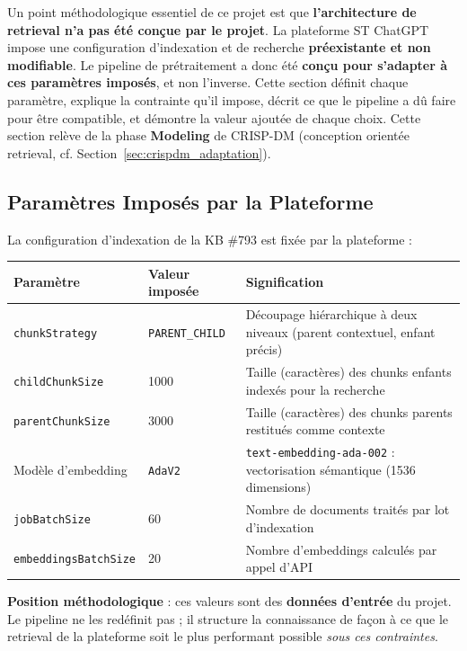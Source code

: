 \documentclass[12pt,a4paper]{report}
\begin{document}
Un point méthodologique essentiel de ce projet est que \textbf{l'architecture de retrieval n'a pas été conçue par le projet}. La plateforme ST ChatGPT impose une configuration d'indexation et de recherche \textbf{préexistante et non modifiable}. Le pipeline de prétraitement a donc été \textbf{conçu pour s'adapter à ces paramètres imposés}, et non l'inverse. Cette section définit chaque paramètre, explique la contrainte qu'il impose, décrit ce que le pipeline a dû faire pour être compatible, et démontre la valeur ajoutée de chaque choix. Cette section relève de la phase \textbf{Modeling} de CRISP-DM (conception orientée retrieval, cf. Section~\ref{sec:crispdm_adaptation}).

\subsection{Paramètres Imposés par la Plateforme}
\label{sec:params_plateforme}

La configuration d'indexation de la KB \#793 est fixée par la plateforme :

\begin{longtable}{p{4cm}p{2.5cm}p{6cm}}
\toprule
\textbf{Paramètre} & \textbf{Valeur imposée} & \textbf{Signification} \\
\midrule
\texttt{chunkStrategy} & \texttt{PARENT\_CHILD} & Découpage hiérarchique à deux niveaux (parent contextuel, enfant précis) \\
\texttt{childChunkSize} & 1000 & Taille (caractères) des chunks enfants indexés pour la recherche \\
\texttt{parentChunkSize} & 3000 & Taille (caractères) des chunks parents restitués comme contexte \\
Modèle d'embedding & \texttt{AdaV2} & \texttt{text-embedding-ada-002} : vectorisation sémantique (1536 dimensions) \\
\texttt{jobBatchSize} & 60 & Nombre de documents traités par lot d'indexation \\
\texttt{embeddingsBatchSize} & 20 & Nombre d'embeddings calculés par appel d'API \\
\bottomrule
\end{longtable}

\textbf{Position méthodologique} : ces valeurs sont des \textbf{données d'entrée} du projet. Le pipeline ne les redéfinit pas ; il structure la connaissance de façon à ce que le retrieval de la plateforme soit le plus performant possible \textit{sous ces contraintes}.
\end{document}
